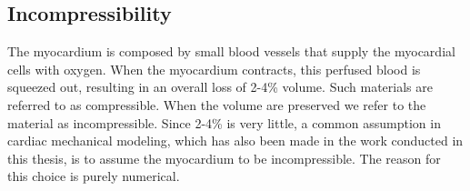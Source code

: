 


\subsection{Incompressibility}
\label{sec:incompressibility}

The myocardium is composed by small blood vessels that supply the
myocardial cells with oxygen. When the myocardium contracts, this
perfused blood is squeezed out, resulting in an overall loss of
2-4\% volume\cite{yin1996compressibility}. Such materials are
referred to as compressible. When the 
volume are preserved we refer to the material as incompressible.
Since 2-4\% is very little, a common assumption in cardiac mechanical modeling,
which has also been made in the work conducted in this thesis, is to assume
the myocardium to be incompressible. The reason for this choice is
purely numerical.

